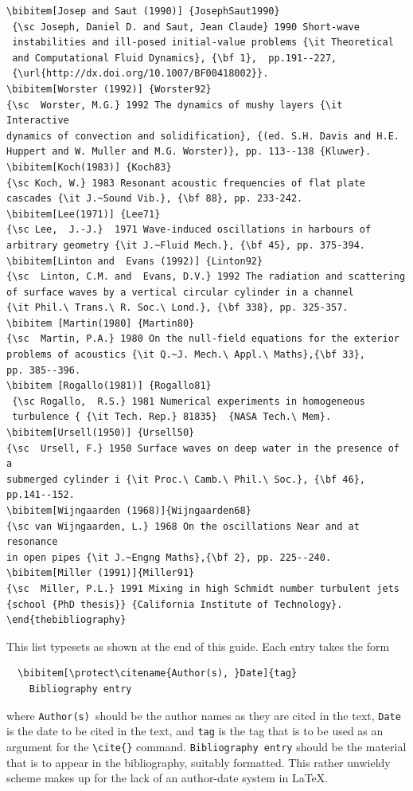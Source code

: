 \documentclass[lineno]{JFM-FLM_Au}
\begin{document}
\begin{verbatim}
\bibitem[Josep and Saut (1990)] {JosephSaut1990}
 {\sc Joseph, Daniel D. and Saut, Jean Claude} 1990 Short-wave
 instabilities and ill-posed initial-value problems {\it Theoretical
 and Computational Fluid Dynamics}, {\bf 1},  pp.191--227,
 {\url{http://dx.doi.org/10.1007/BF00418002}}.
\bibitem[Worster (1992)] {Worster92}
{\sc  Worster, M.G.} 1992 The dynamics of mushy layers {\it Interactive
dynamics of convection and solidification}, {(ed. S.H. Davis and H.E.
Huppert and W. Muller and M.G. Worster)}, pp. 113--138 {Kluwer}.
\bibitem[Koch(1983)] {Koch83}
{\sc Koch, W.} 1983 Resonant acoustic frequencies of flat plate
cascades {\it J.~Sound Vib.}, {\bf 88}, pp. 233-242.
\bibitem[Lee(1971)] {Lee71}
{\sc Lee,  J.-J.}  1971 Wave-induced oscillations in harbours of
arbitrary geometry {\it J.~Fluid Mech.}, {\bf 45}, pp. 375-394.
\bibitem[Linton and  Evans (1992)] {Linton92}
{\sc  Linton, C.M. and  Evans, D.V.} 1992 The radiation and scattering
of surface waves by a vertical circular cylinder in a channel
{\it Phil.\ Trans.\ R. Soc.\ Lond.}, {\bf 338}, pp. 325-357.
\bibitem [Martin(1980] {Martin80}
{\sc  Martin, P.A.} 1980 On the null-field equations for the exterior
problems of acoustics {\it Q.~J. Mech.\ Appl.\ Maths},{\bf 33},
pp. 385--396.
\bibitem [Rogallo(1981)] {Rogallo81}
 {\sc Rogallo,  R.S.} 1981 Numerical experiments in homogeneous
 turbulence { {\it Tech. Rep.} 81835}  {NASA Tech.\ Mem}.
\bibitem[Ursell(1950)] {Ursell50}
{\sc  Ursell, F.} 1950 Surface waves on deep water in the presence of a
submerged cylinder i {\it Proc.\ Camb.\ Phil.\ Soc.}, {\bf 46},
pp.141--152.
\bibitem[Wijngaarden (1968)]{Wijngaarden68}
{\sc van Wijngaarden, L.} 1968 On the oscillations Near and at resonance
in open pipes {\it J.~Engng Maths},{\bf 2}, pp. 225--240.
\bibitem[Miller (1991)]{Miller91}
{\sc  Miller, P.L.} 1991 Mixing in high Schmidt number turbulent jets
{school {PhD thesis}} {California Institute of Technology}.
\end{thebibliography}
\end{verbatim}
%
This list typesets as shown at the end of this guide.
Each entry takes the form
%
\begin{verbatim}
  \bibitem[\protect\citename{Author(s), }Date]{tag}
    Bibliography entry
\end{verbatim}
%
where \verb"Author(s)"\ should be the author names as they are cited in
the text, \verb"Date" is the date to be cited in the text, and \verb"tag"
is the tag that is to be used as an argument for the \verb"\cite{}" command.
\verb"Bibliography entry" should be the
material that is to appear in the bibliography, suitably formatted.  This
rather unwieldy scheme makes up for the lack of an author-date system in
LaTeX.
\end{document}
